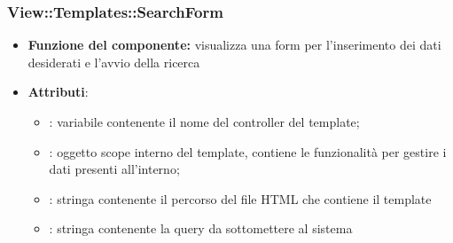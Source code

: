  \subsubsection{View::Templates::SearchForm}
 \begin{itemize}
 \item\textbf{Funzione del componente:} visualizza una form per l’inserimento dei dati desiderati e
l’avvio della ricerca
 \item\textbf{Attributi}:
 	\begin{itemize}
 		\item{}: variabile contenente il nome del controller del template;\\
		\item{}: oggetto scope interno del template, contiene le funzionalità per gestire i dati presenti all’interno;\\
		\item{}: stringa contenente il percorso del file HTML che contiene il template\\
		\item{}: stringa contenente la query da sottomettere al sistema\\
 	\end{itemize}
 \end{itemize}